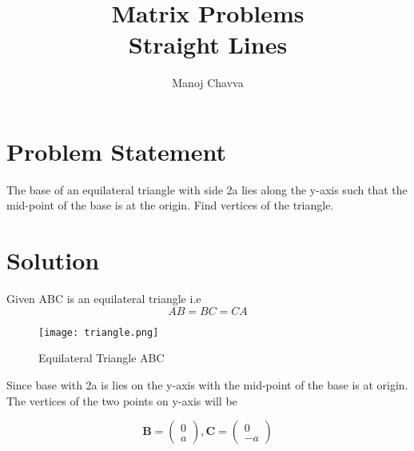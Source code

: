 \documentclass[journal,12pt,twocolumn]{IEEEtran}
\title{Matrix Problems \textbf{\\Straight Lines }}
\author{Manoj Chavva}
\let\vec\mathbf
\begin{document}
\maketitle



\section{Problem Statement}

\noindent The base of an equilateral triangle with side 2a lies along the y-axis such that the mid-point of the base is at the origin. Find vertices of the triangle.


\section{Solution}
\noindent Given ABC is an equilateral triangle i.e 
\begin{equation}
AB = BC = CA  
\end{equation}

\begin{figure}[h]
\texttt{[image: triangle.png]}
\caption{Equilateral Triangle ABC}
\label{fig:triangle}
\end{figure}



\noindent Since base with 2a is lies on the y-axis with the mid-point of the base is at origin. The vertices of the two points on y-axis will be

\begin{equation}
\vec{B}=\begin{pmatrix} 
0\\
a
\end{pmatrix}, {
\vec{C}=\begin{pmatrix} 
0\\
-a
\end{pmatrix} }
\end{equation}




\end{document}
